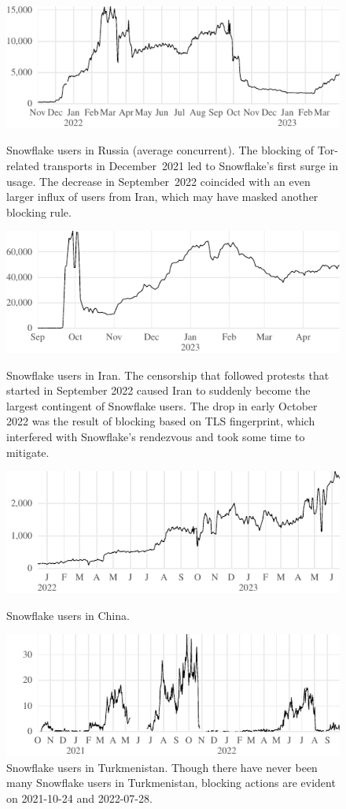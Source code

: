\documentclass[letterpaper,twocolumn]{article}
\begin{document}
\begin{figure}
\includegraphics{figures/users/users-ru}
\caption{
Snowflake users in Russia (average concurrent).
The blocking of Tor-related transports in December~2021
led to Snowflake's first surge in usage.
The decrease in September~2022
coincided with an even larger influx of users from Iran,
which may have masked another blocking rule.
}
\label{fig:user-counts-ru}
\bigskip
\includegraphics{figures/users/users-ir}
\caption{
Snowflake users in Iran.
The censorship that followed
protests that started in September 2022
caused Iran to suddenly become the largest contingent of Snowflake users.
The drop in early October 2022
was the result of blocking based on TLS fingerprint,
which interfered with Snowflake's rendezvous
and took some time to mitigate.
}
\label{fig:user-counts-ir}
\bigskip
\includegraphics{figures/users/users-cn}
\caption{
Snowflake users in China.
}
\label{fig:user-counts-cn}
\bigskip
\includegraphics{figures/users/users-tm}
\caption{
Snowflake users in Turkmenistan.
Though there have never been many Snowflake users in Turkmenistan,
blocking actions are evident on
\mbox{2021-10-24} and \mbox{2022-07-28}.
}
\label{fig:user-counts-tm}
\end{figure}
\end{document}
